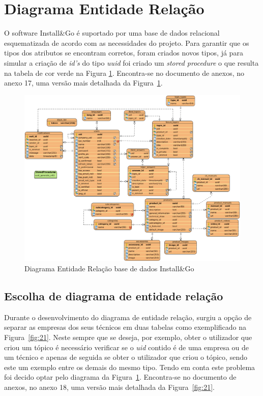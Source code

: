 \section{Diagrama Entidade Relação}

O software Install\&Go é suportado por uma base de dados relacional esquematizada de acordo com as necessidades do projeto. Para garantir que os tipos dos atributos se encontram corretos, foram criados novos tipos, já para simular a criação de \textit{id's} do tipo \textit{uuid} foi criado um \textit{stored procedure} o que resulta na tabela de cor verde na Figura \ref{fig:20}. Encontra-se no documento de anexos, no anexo 17, uma versão mais detalhada da Figura~\ref*{fig:20}.


\begin{figure}[htb]
  \centering
  
  \includegraphics[width=\textwidth]{images/diagramas/diagrama_bd.png}
  \caption{Diagrama Entidade Relação base de dados Install\&Go}
  \label{fig:20}
\end{figure}

\newpage

\subsection{Escolha de diagrama de entidade relação}
Durante o desenvolvimento do diagrama de entidade relação, surgiu 
a opção de separar as empresas dos seus técnicos em duas tabelas como 
exemplificado na Figura~\ref{fig:21}. Neste sempre que se
deseja, por exemplo, obter o utilizador que criou um tópico é necessário
verificar se o \textit{uid} contido é de uma empresa ou de um técnico e apenas de seguida se obter o utilizador que criou o tópico, sendo este um exemplo entre os demais do mesmo tipo. Tendo em conta este problema foi decido optar pelo diagrama da Figura~\ref{fig:20}. Encontra-se no documento de anexos, no anexo 18, uma versão mais detalhada da Figura~\ref*{fig:21}.


